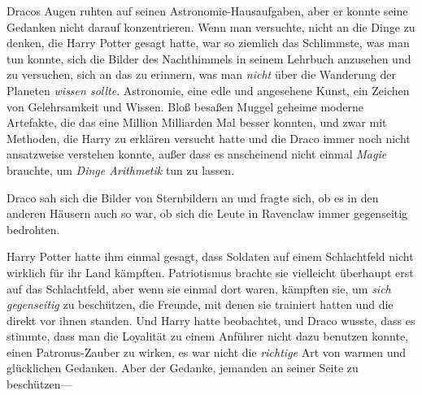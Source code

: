 Dracos Augen ruhten auf seinen Astronomie-Hausaufgaben, aber er konnte seine Gedanken nicht darauf konzentrieren. Wenn man versuchte, nicht an die Dinge zu denken, die Harry Potter gesagt hatte, war so ziemlich das Schlimmste, was man tun konnte, sich die Bilder des Nachthimmels in seinem Lehrbuch anzusehen und zu versuchen, sich an das zu erinnern, was man \emph{nicht} über die Wanderung der Planeten \emph{wissen sollte}. Astronomie, eine edle und angesehene Kunst, ein Zeichen von Gelehrsamkeit und Wissen. Bloß besaßen Muggel geheime moderne Artefakte, die das eine Million Milliarden Mal besser konnten, und zwar mit Methoden, die Harry zu erklären versucht hatte und die Draco immer noch nicht ansatzweise verstehen konnte, außer dass es anscheinend nicht einmal \emph{Magie} brauchte, um \emph{Dinge Arithmetik} tun zu lassen.

Draco sah sich die Bilder von Sternbildern an und fragte sich, ob es in den anderen Häusern auch so war, ob sich die Leute in Ravenclaw immer gegenseitig bedrohten.

Harry Potter hatte ihm einmal gesagt, dass Soldaten auf einem Schlachtfeld nicht wirklich für ihr Land kämpften. Patriotismus brachte sie vielleicht überhaupt erst auf das Schlachtfeld, aber wenn sie einmal dort waren, kämpften sie, um \emph{sich gegenseitig} zu beschützen, die Freunde, mit denen sie trainiert hatten und die direkt vor ihnen standen. Und Harry hatte beobachtet, und Draco wusste, dass es stimmte, dass man die Loyalität zu einem Anführer nicht dazu benutzen konnte, einen Patronus-Zauber zu wirken, es war nicht die \emph{richtige} Art von warmen und glücklichen Gedanken. Aber der Gedanke, jemanden an seiner Seite zu beschützen—


